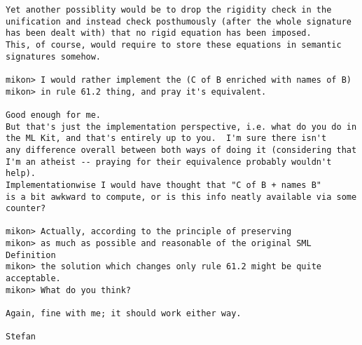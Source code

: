 \documentclass[12pt,a4paper]{article}
\begin{document}
{\begin{verbatim}
Yet another possiblity would be to drop the rigidity check in the
unification and instead check posthumously (after the whole signature
has been dealt with) that no rigid equation has been imposed.
This, of course, would require to store these equations in semantic
signatures somehow. 

mikon> I would rather implement the (C of B enriched with names of B) 
mikon> in rule 61.2 thing, and pray it's equivalent.

Good enough for me.
But that's just the implementation perspective, i.e. what do you do in
the ML Kit, and that's entirely up to you.  I'm sure there isn't
any difference overall between both ways of doing it (considering that
I'm an atheist -- praying for their equivalence probably wouldn't help).
Implementationwise I would have thought that "C of B + names B"
is a bit awkward to compute, or is this info neatly available via some
counter?

mikon> Actually, according to the principle of preserving
mikon> as much as possible and reasonable of the original SML Definition
mikon> the solution which changes only rule 61.2 might be quite acceptable. 
mikon> What do you think?

Again, fine with me; it should work either way.

Stefan
\end{verbatim}}
\end{document}

